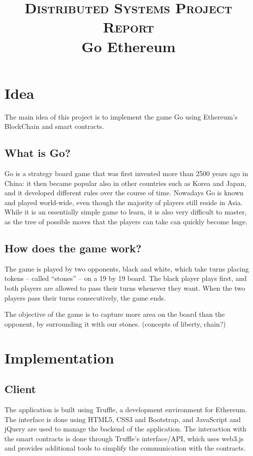 \documentclass[10pt]{article}
\title{\large{\textsc{Distributed Systems Project Report}}\\
      \huge{Go Ethereum}}
\date{}
\author{}
\begin{document}
\maketitle
\vspace{-30pt}
\thispagestyle{fancy}
\pagestyle{fancy}
\section{Idea}
The main idea of this project is to implement the game Go using Ethereum's
BlockChain and smart contracts.
\subsection{What is Go?}
Go is a strategy board game that was first invented more than 2500 years ago
in China: it then became popular also in other countries such as Korea and Japan,
and it developed different rules over the course of time.
Nowadays Go is known and played world-wide, even though the majority of players
still reside in Asia. While it is an essentially simple game to learn, it is also
very difficult to master, as the tree of possible moves that the players can take
can quickly become huge.

\subsection{How does the game work?}
The game is played by two opponents, black and white, which take turns placing
tokens -- called ``stones'' -- on a 19 by 19 board. The black player plays first,
and both players are allowed to pass their turns whenever they want.
When the two players pass their turns consecutively, the game ends.

The objective of the game is to capture more area on the board than the opponent,
by surrounding it with our stones.  (concepts of liberty, chain?)

\section{Implementation}

\subsection{Client}
The application is built using Truffle, a development environment for Ethereum.
The interface is done using HTML5, CSS3 and Bootstrap, and JavaScript and jQuery
are used to manage the backend of the application. The interaction with the
smart contracts is done through Truffle's interface/API, which uses web3.js and
provides additional tools to simplify the communication with the contracts.
\end{document}
